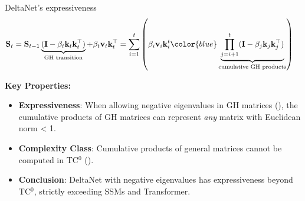  \begin{frame}{DeltaNet's expressiveness}
    \begin{align*}
        \mathbf{S}_t &= \mathbf{S}_{t-1} \underbrace{(\mathbf{I} - \beta_t \mathbf{k}_t \mathbf{k}_t^\top)}_{\text{GH transition}} + \beta_t \mathbf{v}_t \mathbf{k}_t^\top 
        = \sum_{i=1}^{t} \left(\beta_i \mathbf{v}_i \mathbf{k}_i^t {\color{blue}\underbrace{\prod_{j=i+1}^{t} (\mathbf{I} - \beta_j \mathbf{k}_j \mathbf{k}_j^\top)}_{\text{cumulative GH products}}}\right)
    \end{align*}

    \vspace{-8mm}
    
    \textbf{Key Properties:}
    \begin{itemize}
        
        \item \textbf{Expressiveness}: When allowing negative eigenvalues in GH matrices (\cite{Grazzi2024UnlockingSI}), {\color{blue}the cumulative products of GH matrices} can represent \textit{any} matrix with Euclidean norm < 1.
        
        \item \textbf{Complexity Class}: 
            {\color{blue}Cumulative products of general matrices} cannot be computed in TC$^0$ (\cite{Mereghetti2000ThresholdCF}).

        \item \textbf{Conclusion}: DeltaNet with negative eigenvalues has expressiveness beyond TC$^0$, strictly exceeding SSMs and Transformer.
    \end{itemize}
\end{frame}

    
    
